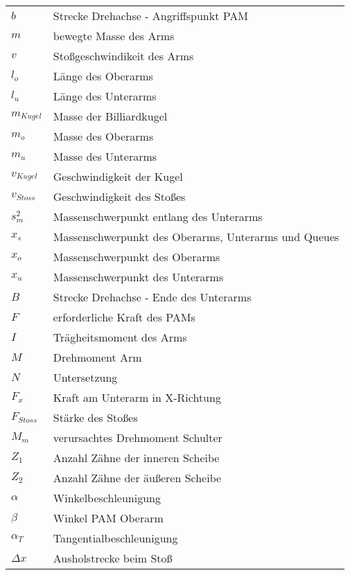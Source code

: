     \begin{table}[h]
        \begin{tabular}{@{}ll@{}}%
            \(b\) & Strecke Drehachse - Angriffspunkt PAM\\
            \(m\) & bewegte Masse des Arms\\
            \(v\) & Stoßgeschwindikeit des Arms\\
            
            \(l_o\) & Länge des Oberarms\\
            \(l_u\) & Länge des Unterarms\\
            \(m_{Kugel}\) & Masse der Billiardkugel\\
            \(m_o\) & Masse des Oberarms\\
            \(m_u\) & Masse des Unterarms\\
            \(v_{Kugel}\) & Geschwindigkeit der Kugel\\
            \(v_{Stoss}\) & Geschwindigkeit des Stoßes\\
            \(s^2_{m}\) & Massenschwerpunkt entlang des Unterarms\\
            \(x_s\) & Massenschwerpunkt des Oberarms, Unterarms und Queues\\
            \(x_o\) & Massenschwerpunkt des Oberarms\\
            \(x_u\) & Massenschwerpunkt des Unterarms\\
            
            \(B\) & Strecke Drehachse - Ende des Unterarms\\
            \(F\) & erforderliche Kraft des PAMs\\
            \(I\) & Trägheitsmoment des Arms\\
            \(M\) & Drehmoment Arm\\
            \(N\) & Untersetzung\\
            
            \(F_{x}\) & Kraft am Unterarm in X-Richtung\\
            \(F_{Stoss}\) & Stärke des Stoßes\\
            \(M_m\) & verursachtes Drehmoment Schulter\\
            \(Z_1\) & Anzahl Zähne der inneren Scheibe\\
            \(Z_2\) & Anzahl Zähne der äußeren Scheibe\\
            
            \(\alpha\) & Winkelbeschleunigung\\
            \(\beta\) & Winkel PAM Oberarm\\
            
            \(\alpha_T\) & Tangentialbeschleunigung\\
            \(\Delta x\) & Ausholstrecke beim Stoß\\
    \end{tabular}\label{tab:glossar}
    \end{table}